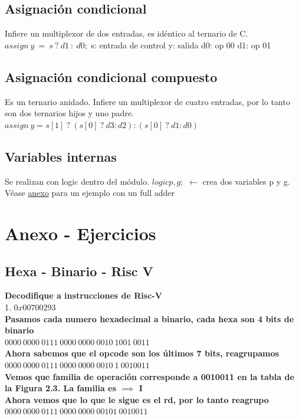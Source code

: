 \documentclass[10pt,a4paper]{article}
\begin{document}
\subsection*{Asignación condicional}
Infiere un multiplexor de dos entradas, es idéntico al ternario de C.
$ assign \ y \ = \ s \ ? \ d1 \ : \ d0; $
s: entrada de control 
y: salida
d0: op 00
d1: op 01
\subsection*{Asignación condicional compuesto}
Es un ternario anidado. Infiere un multiplexor de cuatro entradas, por lo tanto son dos ternarios hijos y uno padre.
$ assign \ y = s[1] \ ? \ (s[0] \ ? \ d3 : d2) : (s[0] \ ? \ d1 : d0)$
\subsection*{Variables internas}
Se realizan con logic dentro del módulo.
$logic p, g;$ $ \leftarrow  $ crea dos variables p y g. \\
Véase \hyperref[subsec:SVL_FullAdder]{anexo} para un ejemplo con un full adder

\section*{Anexo - Ejercicios}
\subsection*{Hexa - Binario - Risc V}
\textbf{Decodifique a instrucciones de Risc-V} \\
1. $0x00700293$ \\ 

\textbf{Pasamos cada numero hexadecimal a binario, cada hexa son 4 bits de binario} \\ 
$0000 \ 0000 \ 0111 \ 0000 \ 0000 \ 0010 \ 1001 \ 0011$ \\

\textbf{Ahora sabemos que el opcode son los últimos 7 bits, reagrupamos} \\ 
$0000 \ 0000 \ 0111 \ 0000 \ 0000 \ 0010 \ 1 \ 0010011$ \\

\textbf{Vemos que familia de operación corresponde a 0010011 en la tabla de la Figura 2.3. La familia es $ \implies $ I} \\
\textbf{Ahora vemos que lo que le sigue es el rd, por lo tanto reagrupo} \\
$0000 \ 0000 \ 0111 \ 0000 \ 0000 \ 00101 \ 0010011$ \\
\end{document}
